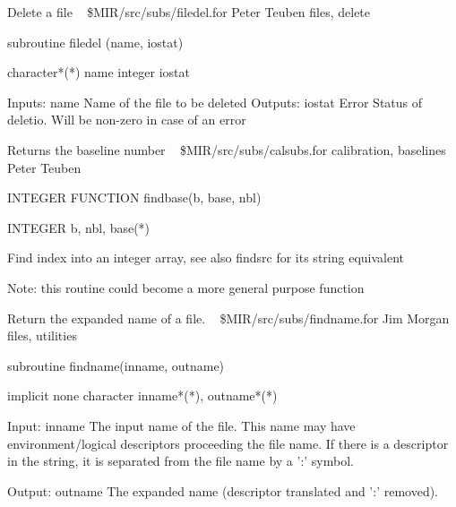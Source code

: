 %
\noindent Delete a file
\newline \ 
\newline {} \$MIR/src/subs/filedel.for
\newline {} Peter Teuben
\newline {} files, delete
\par{\tenpoint
{\eightpoint\begintt
      subroutine filedel (name, iostat)

      character*(*) name
      integer iostat

     Inputs:     
       name      Name of the file to be deleted
     Outputs:
       iostat    Error Status of deletio. Will be non-zero in case
                 of an error
\endtt}
\par}
%
\noindent Returns the baseline number
\newline \ 
\newline {} \$MIR/src/subs/calsubs.for
\newline {} calibration, baselines
\newline \abox{Responsible:} Peter Teuben
\par{\tenpoint
{\eightpoint\begintt
        INTEGER FUNCTION findbase(b, base, nbl)

        INTEGER b, nbl, base(*)

       Find index into an integer array, see also findsrc for
       its string equivalent

       Note: this routine could become a more general purpose function
\endtt}
\par}
%
\noindent Return the expanded name of a file.
\newline \ 
\newline {} \$MIR/src/subs/findname.for
\newline \abox{Responsible:} Jim Morgan
\newline {} files, utilities
\par{\tenpoint
{\eightpoint\begintt
      subroutine findname(inname, outname)

      implicit none
      character inname*(*), outname*(*)

 Input:
   inname   The input name of the file.  This name may have
            environment/logical descriptors proceeding the file name.
            If there is a descriptor in the string, it is separated
            from the file name by a ':' symbol.

 Output:
   outname  The expanded name (descriptor translated and ':' removed).
\endtt}
\par}
